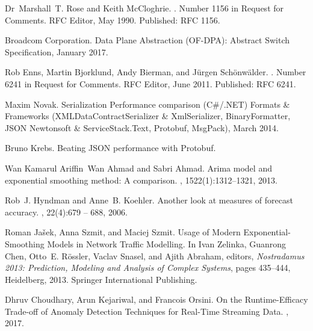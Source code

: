 \begin{thebibliography}{10}
Dr~Marshall~T. Rose and Keith McCloghrie.
.
\newblock Number 1156 in Request for {Comments}. RFC Editor, May 1990.
\newblock Published: RFC 1156.

{Broadcom Corporation}.
 {Data} {Plane} {Abstraction} ({OF}-{DPA}):
  {Abstract} {Switch} {Specification}, January 2017.

Rob Enns, Martin Bjorklund, Andy Bierman, and J{\"u}rgen Sch{\"o}nw{\"a}lder.
.
\newblock Number 6241 in Request for {Comments}. RFC Editor, June 2011.
\newblock Published: RFC 6241.

{Maxim Novak}.
\newblock Serialization {Performance} comparison ({C}\#/.{NET}) {\textendash}
  {Formats} \& {Frameworks} ({XML}{\textendash}{DataContractSerializer} \&
  {XmlSerializer}, {BinaryFormatter}, {JSON}{\textendash} {Newtonsoft} \&
  {ServiceStack}.{Text}, {Protobuf}, {MsgPack}), March 2014.

{Bruno Krebs}.
\newblock Beating {JSON} performance with {Protobuf}.

Wan Kamarul Ariffin~Wan Ahmad and Sabri Ahmad.
\newblock Arima model and exponential smoothing method: {A} comparison.
, 1522(1):1312--1321, 2013.

Rob~J. Hyndman and Anne~B. Koehler.
\newblock Another look at measures of forecast accuracy.
, 22(4):679 -- 688, 2006.

Roman Ja{\v s}ek, Anna Szmit, and Maciej Szmit.
\newblock Usage of {Modern} {Exponential}-{Smoothing} {Models} in {Network}
  {Traffic} {Modelling}.
\newblock In Ivan Zelinka, Guanrong Chen, Otto~E. R{\"o}ssler, Vaclav Snasel,
  and Ajith Abraham, editors, {\em Nostradamus 2013: {Prediction}, {Modeling}
  and {Analysis} of {Complex} {Systems}}, pages 435--444, Heidelberg, 2013.
  Springer International Publishing.

Dhruv Choudhary, Arun Kejariwal, and Francois Orsini.
\newblock On the {Runtime}-{Efficacy} {Trade}-off of {Anomaly} {Detection}
  {Techniques} for {Real}-{Time} {Streaming} {Data}.
, 2017.

\end{thebibliography}
